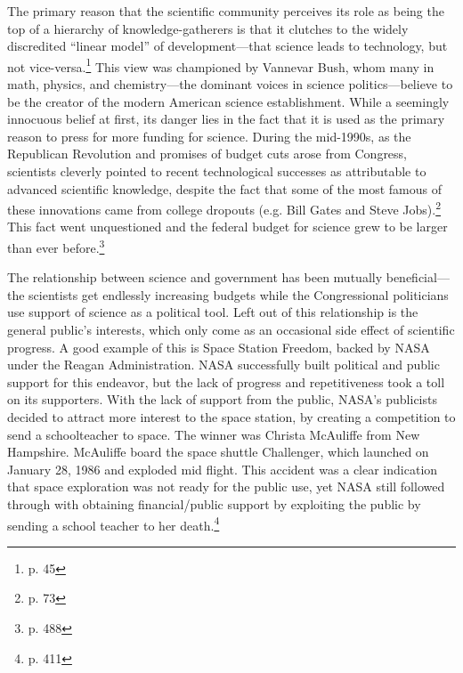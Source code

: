 \documentclass{article}[12pt]
\begin{document}
The primary reason that the scientific community perceives its role as being
the top of a hierarchy of knowledge-gatherers is that it clutches to the widely
discredited ``linear model'' of development---that science leads to technology,
but not vice-versa.\footnote{p. 45} This view was championed by Vannevar Bush,
whom many in math, physics, and chemistry---the dominant voices in science
politics---believe to be the creator of the modern American science
establishment. While a seemingly innocuous belief at first, its danger lies in
the fact that it is used as the primary reason to press for more funding for
science. During the mid-1990s, as the Republican Revolution and promises of
budget cuts arose from Congress, scientists cleverly pointed to recent
technological successes as attributable to advanced scientific knowledge,
despite the fact that some of the most famous of these innovations came from
college dropouts (e.g. Bill Gates and Steve Jobs).\footnote{p. 73} This fact went
unquestioned and the federal budget for science grew to be larger than ever
before.\footnote{p. 488}

The relationship between science and government has been mutually
beneficial---the scientists get endlessly increasing budgets while the
Congressional politicians use support of science as a political tool. Left out
of this relationship is the general public's interests, which only come as an
occasional side effect of scientific progress. A good example of this is
Space Station Freedom, backed by NASA under the Reagan Administration.  NASA
successfully built political and public support for this endeavor, but the
lack of progress and repetitiveness took a toll on its supporters.  With the
lack of support from the public, NASA's publicists decided to attract more
interest to the space station, by creating a competition to send a
schoolteacher to space.  The winner was Christa McAuliffe from New Hampshire.
McAuliffe board the space shuttle Challenger, which launched on January 28,
1986 and exploded mid flight.  This accident was a clear indication that space
exploration was not ready for the public use, yet NASA still followed through
with obtaining financial/public support by exploiting the
public by sending a school teacher to her death.\footnote{p. 411}
\end{document}
